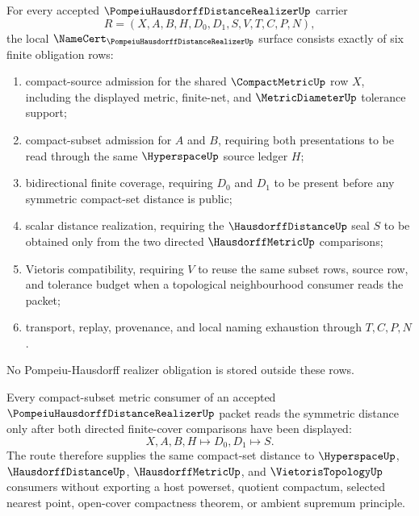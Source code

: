 \begin{theorem}
\label{thm:pompeiu-hausdorff-distance-realizer-obligations}
For every accepted $\PompeiuHausdorffDistanceRealizerUp$ carrier
$$
R=(X,A,B,H,D_0,D_1,S,V,T,C,P,N),
$$
the local $\NameCert_{\PompeiuHausdorffDistanceRealizerUp}$ surface consists exactly of six finite obligation rows:
\begin{enumerate}
\item compact-source admission for the shared $\CompactMetricUp$ row $X$, including the displayed metric, finite-net, and $\MetricDiameterUp$ tolerance support;
\item compact-subset admission for $A$ and $B$, requiring both presentations to be read through the same $\HyperspaceUp$ source ledger $H$;
\item bidirectional finite coverage, requiring $D_0$ and $D_1$ to be present before any symmetric compact-set distance is public;
\item scalar distance realization, requiring the $\HausdorffDistanceUp$ seal $S$ to be obtained only from the two directed $\HausdorffMetricUp$ comparisons;
\item Vietoris compatibility, requiring $V$ to reuse the same subset rows, source row, and tolerance budget when a topological neighbourhood consumer reads the packet;
\item transport, replay, provenance, and local naming exhaustion through $T,C,P,N$.
\end{enumerate}
No Pompeiu-Hausdorff realizer obligation is stored outside these rows.
\end{theorem}

\begin{theorem}
\label{thm:pompeiu-hausdorff-distance-realizer-bidirectional-coverage}
Every compact-subset metric consumer of an accepted $\PompeiuHausdorffDistanceRealizerUp$ packet reads the symmetric distance only after both directed finite-cover comparisons have been displayed:
$$
X,A,B,H \longmapsto D_0,D_1 \longmapsto S .
$$
The route therefore supplies the same compact-set distance to $\HyperspaceUp$, $\HausdorffDistanceUp$, $\HausdorffMetricUp$, and $\VietorisTopologyUp$ consumers without exporting a host powerset, quotient compactum, selected nearest point, open-cover compactness theorem, or ambient supremum principle.
\end{theorem}

